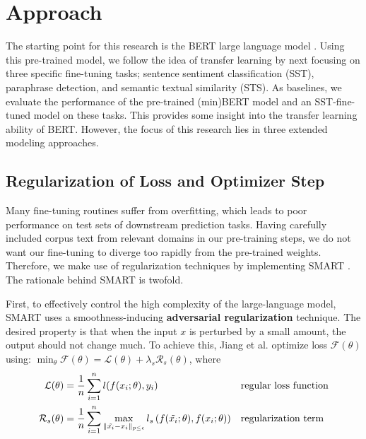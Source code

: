 \documentclass{article}
\begin{document}
\section{Approach}
\label{sec: approach}
The starting point for this research is the BERT large language model \cite{devlin2018bert}. Using this pre-trained model, we follow the idea of transfer learning by next focusing on three specific fine-tuning tasks; sentence sentiment classification (SST), paraphrase detection, and semantic textual similarity (STS). As baselines, we evaluate the performance of the pre-trained (min)BERT model and an SST-fine-tuned model on these tasks. This provides some insight into the transfer learning ability of BERT. However, the focus of this research lies in three extended modeling approaches.

\subsection{Regularization of Loss and Optimizer Step}
Many fine-tuning routines suffer from overfitting, which leads to poor performance on test sets of downstream prediction tasks. Having carefully included corpus text from relevant domains in our pre-training steps, we do not want our fine-tuning to diverge too rapidly from the pre-trained weights. Therefore, we make use of regularization techniques by implementing SMART \cite{smart}. The rationale behind SMART is twofold.

First, to effectively control the high complexity of the large-language model, SMART uses a smoothness-inducing \textbf{adversarial regularization} technique. The desired property is that when the input $x$ is perturbed by a small amount, the output should not change much. To achieve this, Jiang et al. \cite{smart} optimize loss $\mathcal{F}(\theta)$ using: $\min_{\theta} \mathcal{F}(\theta) = \mathcal{L}(\theta) + \lambda_{s}\mathcal{R}_{s}(\theta)$, where
\begin{align*}
\mathcal{L}(\theta) & = \frac{1}{n} \sum_{i=1}^{n} l(f(x_{i};\theta), y_{i}) && \text{regular loss function} \\
\mathcal{R}_{s}(\theta) & = \frac{1}{n} \sum_{i=1}^{n} \max_{\lVert \Tilde{x_{i}} - x_{i} \rVert_{p \leq \epsilon}} l_{s}\left(f(\Tilde{x_{i}}; \theta), f(x_{i}; \theta)\right) && \text{regularization term}\\
\end{align*} 
\end{document}
